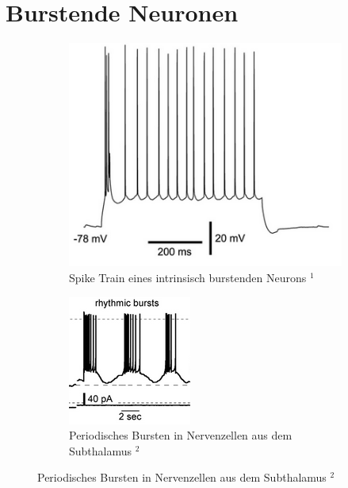 \documentclass[12pt,a4paper]{article}
\begin{document}

\thispagestyle{empty}
\newpage
\tableofcontents
\thispagestyle{empty}
\newpage
{}
\section{Burstende Neuronen}
\begin{figure}[H]
	\centering
	\begin{subfigure}{.45\textwidth}
		\centering
		\includegraphics[scale=0.4]{25.png}
		\caption*{Spike Train eines intrinsisch burstenden Neurons $^1$}
		\label{fig25}
	\end{subfigure}\hspace{5mm}%
	\begin{subfigure}{.45\textwidth}
		\centering
		\includegraphics[scale=0.8]{26.png}
		\caption*{Periodisches Bursten in Nervenzellen aus dem Subthalamus $^2$}
		\label{fig26}
	\end{subfigure}
\end{figure}
\end{document}
